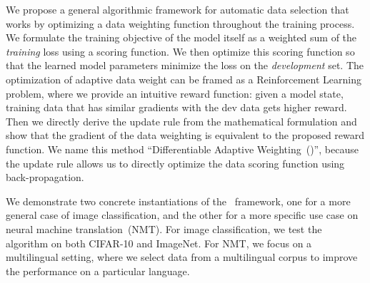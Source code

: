 We propose a general algorithmic framework for automatic data selection that works by optimizing a data weighting function throughout the training process. We formulate the training objective of the model itself as a weighted sum of the \textit{training} loss using a scoring function. We then optimize this scoring function so that the learned model parameters minimize the loss on the \textit{development} set. The optimization of adaptive data weight can be framed as a Reinforcement Learning problem, where we provide an intuitive reward function: given a model state, training data that has similar gradients with the dev data gets higher reward. Then we directly derive the update rule from the mathematical formulation and show that the gradient of the data weighting is equivalent to the proposed reward function. We name this method ``Differentiable Adaptive Weighting~(\dds)'', because the update rule allows us to directly optimize the data scoring function using back-propagation.

We demonstrate two concrete instantiations of the \dds~framework, one for a more general case of image classification, and the other for a more specific use case on neural machine translation~(NMT). For image classification, we test the algorithm on both CIFAR-10 and ImageNet. For NMT, we focus on a multilingual setting, where we select data from a multilingual corpus to improve the performance on a particular language. 